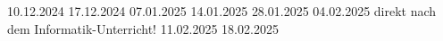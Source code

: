 \renewcommand{\Klassetext}{10c}



\dbprojekt %
{10.12.2024} %
{17.12.2024} %
{07.01.2025} %
{14.01.2025} %
{28.01.2025} %
{04.02.2025} %
{direkt nach dem Informatik-Unterricht!} %
{11.02.2025} %
{18.02.2025} %